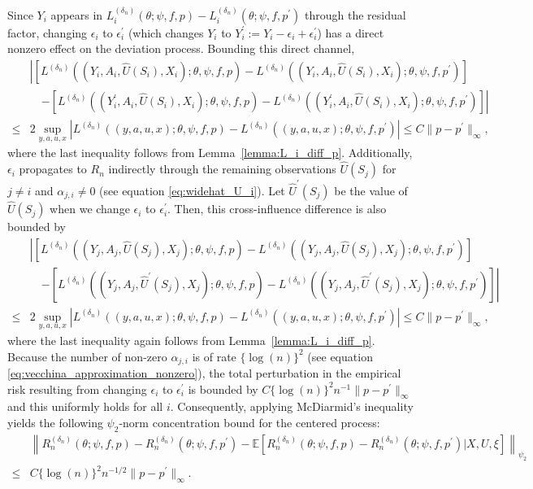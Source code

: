 \documentclass[12pt]{article}
\newcommand{\E}{\mathbb{E}}
\begin{document}
Since $Y_i$ appears in $L^{(\delta_n)}_i(\theta;\psi,f,p) - L^{(\delta_n)}_i(\theta;\psi,f,p^\prime)$ through the residual factor, changing $\epsilon_i$ to $\epsilon_i^\prime$ (which changes $Y_i$ to $Y_i^\prime := Y_i - \epsilon_i + \epsilon_i^\prime$) has a direct nonzero effect on the deviation process. Bounding this direct channel,
\begin{align*}
&\left|\left[L^{(\delta_n)}((Y_i,A_i,\widehat U(S_i),X_i);\theta,\psi,f,p) - L^{(\delta_n)}((Y_i,A_i,\widehat U(S_i),X_i);\theta,\psi,f,p^\prime)\right]\right.\\
        &\quad\left. -\left[L^{(\delta_n)}((Y_i^\prime,A_i,\widehat U(S_i),X_i);\theta,\psi,f,p) - L^{(\delta_n)}((Y_i^\prime,A_i,\widehat U(S_i),X_i);\theta,\psi,f,p^\prime)\right]\right|\\
        \leq  & 2\sup_{y,a,u,x}\left|L^{(\delta_n)}((y,a,u,x);\theta,\psi,f,p) - L^{(\delta_n)}((y,a,u,x);\theta,\psi,f,p^\prime)\right|
        \leq  C\|p-p^\prime\|_\infty,
\end{align*}
where the last inequality follows from Lemma~\ref{lemma:L_i_diff_p}. Additionally, $\epsilon_i$ propagates to $R_n$ indirectly through the remaining observations $\widehat U(S_j)$ for $j\neq i$ and $\alpha_{j,i}\neq 0$ (see equation \eqref{eq:widehat_U_i}). Let $\widehat U^\prime(S_j)$ be the value of $\widehat U(S_j)$ when we change $\epsilon_i$ to $\epsilon_i^\prime$. Then, this cross-influence difference is also bounded by
\begin{align*}
&\left|\left[L^{(\delta_n)}((Y_j,A_j,\widehat U(S_j),X_j);\theta,\psi,f,p) - L^{(\delta_n)}((Y_j,A_j,\widehat U(S_j),X_j);\theta,\psi,f,p^\prime)\right]\right.\\
        &\quad\left.-\left[L^{(\delta_n)}((Y_j,A_j,\widehat U^\prime(S_j),X_j);\theta,\psi,f,p) - L^{(\delta_n)}((Y_j,A_j,\widehat U^\prime(S_j),X_j);\theta,\psi,f,p^\prime)\right]\right|\\
        \leq  & 2\sup_{y,a,u,x}\left|L^{(\delta_n)}((y,a,u,x);\theta,\psi,f,p) - L^{(\delta_n)}((y,a,u,x);\theta,\psi,f,p^\prime)\right|
        \leq  C\|p-p^\prime\|_\infty,
\end{align*}
where the last inequality again follows from Lemma~\ref{lemma:L_i_diff_p}. Because the number of non-zero $\alpha_{j,i}$ is of rate $\{\log(n)\}^2$ (see equation \eqref{eq:vecchina_approximation_nonzero}), the total perturbation in the empirical risk resulting from changing $\epsilon_i$ to $\epsilon_i^\prime$ is bounded by $C\{\log(n)\}^2 n^{-1}\|p - p^\prime\|_{\infty}$ and this uniformly holds for all $i$. Consequently, applying McDiarmid's inequality yields the following $\psi_2$-norm concentration bound for the centered process:
\begin{align*}
    &\left\|R_n^{(\delta_n)}(\theta;\psi,f,p)-R_n^{({\delta_n})}(\theta;\psi,f,p^\prime)-\E\left[R_n^{(\delta_n)}(\theta;\psi,f,p)-R_n^{({\delta_n})}(\theta;\psi,f,p^\prime)|X,U,\xi\right]\right\|_{\psi_2}\\
    \leq & C\{\log(n)\}^2 n^{-1/2}\|p - p^\prime\|_{\infty}.
\end{align*}
\end{document}
